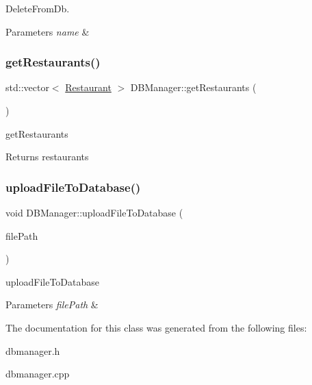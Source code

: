 Delete\+From\+Db. 


\begin{DoxyParams}{Parameters}
{\em name} & \\
\hline
\end{DoxyParams}
\mbox{\label{class_d_b_manager_ab726a1be7b797085723623f5497946e6}} 
\subsubsection{\texorpdfstring{get\+Restaurants()}{getRestaurants()}}
{\footnotesize\ttfamily std\+::vector$<$ \hyperlink{class_restaurant}{Restaurant} $>$ D\+B\+Manager\+::get\+Restaurants (\begin{DoxyParamCaption}{ }\end{DoxyParamCaption})}



get\+Restaurants 

\begin{DoxyReturn}{Returns}
restaurants 
\end{DoxyReturn}
\mbox{\label{class_d_b_manager_a2d29cb558fdbf54d17b180088bd8651e}} 
\subsubsection{\texorpdfstring{upload\+File\+To\+Database()}{uploadFileToDatabase()}}
{\footnotesize\ttfamily void D\+B\+Manager\+::upload\+File\+To\+Database (\begin{DoxyParamCaption}\item[{const Q\+String \&}]{file\+Path }\end{DoxyParamCaption})}



upload\+File\+To\+Database 


\begin{DoxyParams}{Parameters}
{\em file\+Path} & \\
\hline
\end{DoxyParams}


The documentation for this class was generated from the following files\+:\begin{DoxyCompactItemize}
\item 
dbmanager.\+h\item 
dbmanager.\+cpp\end{DoxyCompactItemize}
